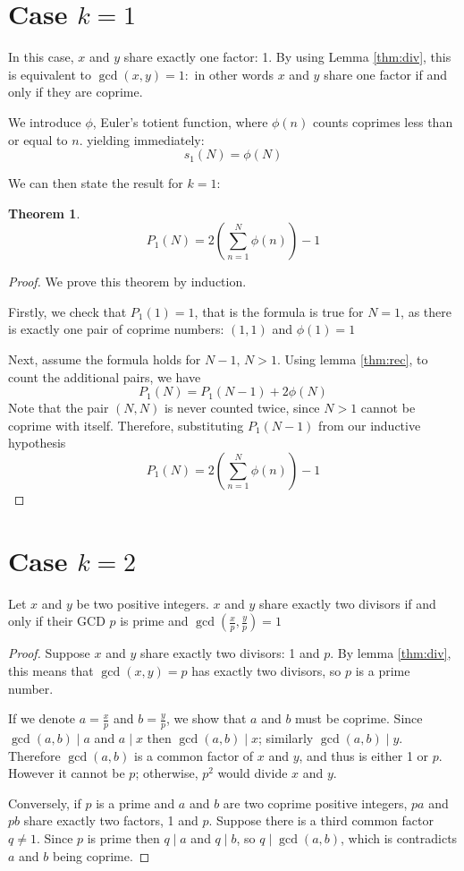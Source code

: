 \documentclass[a4paper, 10pt]{article}
\numberwithin{equation}{section} %
\begin{document}
\section*{Case $k = 1$}
In this case, $x$ and $y$ share exactly one factor: 1.
By using Lemma \ref{thm:div}, this is equivalent to $\gcd(x,y)=1$:~in other words $x$ and $y$ share one factor
if and only if they are coprime.

We introduce $\phi$, Euler's totient function, where $\phi(n)$ counts coprimes less than or equal to $n$.
yielding immediately:
\[
    s_1(N) = \phi(N)
\]

We can then state the result for $k=1$:
\newtheorem{thm}{Theorem}
\begin{thm}
\[
    P_1(N) = 2 \left( \sum_{n=1}^N \phi(n)  \right)- 1
\]
\end{thm}
\begin{proof}
    We prove this theorem by induction.

    Firstly, we check that $P_1(1) = 1$, that is the formula is true for $N = 1$,
    as there is exactly one pair of coprime numbers: $(1,1)$ and
    $\phi(1) = 1$

    Next, assume the formula holds for $N -1, \,N > 1$.
    Using lemma \ref{thm:rec}, to count the additional pairs, we have
     \[ P_1(N) = P_1(N-1) + 2 \phi(N) \]
    Note that the pair $(N, N)$ is never counted twice, since $N>1$ cannot be coprime with itself.
    Therefore, substituting $P_1(N-1)$ from our inductive hypothesis
    \[
        P_1(N) = 2 \left( \sum_{n=1}^{N} \phi(n)  \right) - 1
    \]

\end{proof}

\section*{Case $k=2$}

\begin{lemma}
Let $x$ and $y$ be two positive integers. $x$ and $y$ share exactly two divisors
if and only if their GCD $p$ is prime and $\gcd(\frac{x}{p}, \frac{y}{p}) = 1$
\label{thm:prime}
\end{lemma}
\begin{proof}
Suppose $x$ and $y$ share exactly two divisors: 1 and $p$.
By lemma \ref{thm:div}, this means that $\gcd(x,y) = p$
has exactly two divisors, so $p$ is a prime number.

If we denote $a = \frac{x}{p}$ and $b= \frac{y}{p}$, we show that $a$ and $b$ must be coprime.
Since $\gcd(a,b)  \mid  a$ and $a \mid x$ then $\gcd(a,b)  \mid  x$; similarly $\gcd(a,b)  \mid  y$.
Therefore $\gcd(a,b)$ is a common factor of $x$ and $y$, and thus is either 1 or $p$.
However it cannot be $p$; otherwise, $p^2$ would divide $x$ and $y$.

Conversely, if $p$ is a prime and $a$ and $b$ are two coprime positive integers,
$pa$ and $pb$ share exactly two factors, 1 and $p$.
Suppose there is a third common factor $q \neq 1$. Since $p$ is prime then $q  \mid  a$ and $q  \mid b$,
so $q  \mid  \gcd(a,b)$, which is contradicts $a$ and $b$ being coprime.
\end{proof}
\end{document}
